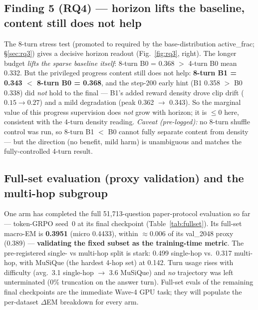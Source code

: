 \documentclass[11pt,a4paper]{article}
\begin{document}
\subsection{Finding 5 (RQ4) --- horizon lifts the baseline, content still does not help}

The 8-turn stress test (promoted to required by the base-distribution active\_frac; \S\ref{sec:rq3})
gives a decisive horizon readout (Fig.~\ref{fig:rq3}, right). The longer budget \emph{lifts the
sparse baseline itself}: 8-turn B0 = 0.368 $>$ 4-turn B0 mean 0.332. But the privileged progress
content still does not help: \textbf{8-turn B1 = 0.343 $<$ 8-turn B0 = 0.368}, and the step-200
early hint (B1 0.358 $>$ B0 0.338) did \emph{not} hold to the final --- B1's added reward density
drove clip drift ($0.15\to0.27$) and a mild degradation (peak 0.362 $\to$ 0.343). So the marginal
value of this progress supervision does \emph{not} grow with horizon; it is $\leq$0 here,
consistent with the 4-turn density reading. \emph{Caveat (pre-logged):} no 8-turn shuffle control
was run, so 8-turn B1 $<$ B0 cannot fully separate content from density --- but the direction (no
benefit, mild harm) is unambiguous and matches the fully-controlled 4-turn result.

\subsection{Full-set evaluation (proxy validation) and the multi-hop subgroup}

One arm has completed the full 51{,}713-question paper-protocol evaluation so far --- token-GRPO
seed~0 at its final checkpoint (Table~\ref{tab:fullset}). Its full-set macro-EM is
\textbf{0.3951} (micro 0.4433), within $\approx$0.006 of its val\_2048 proxy (0.389) ---
\textbf{validating the fixed subset as the training-time metric}. The pre-registered single- vs
multi-hop split is stark: 0.499 single-hop vs.\ 0.317 multi-hop, with MuSiQue (the hardest
4-hop set) at 0.142. Turn usage rises with difficulty (avg.\ 3.1 single-hop $\to$ 3.6 MuSiQue)
and \emph{no} trajectory was left unterminated (0\% truncation on the answer turn). Full-set evals
of the remaining final checkpoints are the immediate Wave-4 GPU task; they will populate the
per-dataset $\Delta$EM breakdown for every arm.
\end{document}
